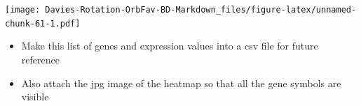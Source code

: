 \documentclass[
]{article}
\newenvironment{Shaded}{\begin{snugshade}}{\end{snugshade}}
\newcommand{\DataTypeTok}[1]{\textcolor[rgb]{0.13,0.29,0.53}{#1}}
\newcommand{\KeywordTok}[1]{\textcolor[rgb]{0.13,0.29,0.53}{\textbf{#1}}}
\newcommand{\NormalTok}[1]{#1}
\newcommand{\OperatorTok}[1]{\textcolor[rgb]{0.81,0.36,0.00}{\textbf{#1}}}
\newcommand{\OtherTok}[1]{\textcolor[rgb]{0.56,0.35,0.01}{#1}}
\newcommand{\StringTok}[1]{\textcolor[rgb]{0.31,0.60,0.02}{#1}}
\providecommand{\tightlist}{%
  \setlength{\itemsep}{0pt}\setlength{\parskip}{0pt}}
\begin{document}
\texttt{[image: Davies-Rotation-OrbFav-BD-Markdown\_files/figure-latex/unnamed-chunk-61-1.pdf]}

\begin{itemize}
\tightlist
\item
  Make this list of genes and expression values into a csv file for
  future reference
\item
  Also attach the jpg image of the heatmap so that all the gene symbols
  are visible
\end{itemize}

\begin{Shaded}
\end{Shaded}
\end{document}
